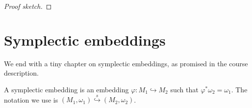 \documentclass[a4paper]{article}
\begin{document}
\begin{proof}[Proof sketch]
%
\end{proof}



\section{Symplectic embeddings}
We end with a tiny chapter on symplectic embeddings, as promised in the course description.
\begin{defi}
  A symplectic embedding is an embedding $\varphi: M_1 \hookrightarrow M_2$ such that $\varphi^* \omega_2 = \omega_1$. The notation we use is $(M_1, \omega_1) \overset{s}{\hookrightarrow} (M_2, \omega_2)$.
\end{defi}
\end{document}
